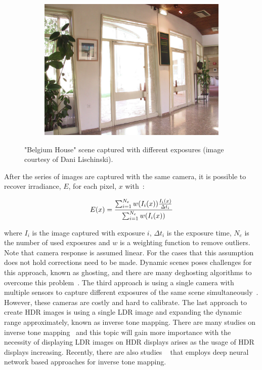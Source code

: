 \begin{figure}
\begin{subfigure}[b]{0.33\textwidth}
    \includegraphics[width=\textwidth]{figures/chapter2/exposure/bh9.jpg}
\end{subfigure}\hfill
\caption{"Belgium House" scene captured with different exposures (image courtesy of Dani Lischinski). }
\label{fig:exposures}
\end{figure}

After the series of images are captured with the same camera, it is possible to recover irradiance, $E$, for each pixel, $x$ with~\cite{banterle2017advanced}:

\begin{equation}
    E(x) = {{\sum^{N_e}_{i=1} w(I_i(x)) {I_i(x) \over \Delta t_i}} \over {\sum^{N_e}_{i=1} w(I_i(x))}} 
\end{equation}

where $I_i$ is the image captured with exposure $i$, $\Delta t_i$ is the exposure time, $N_e$ is the number of used exposures and $w$ is a weighting function to remove outliers. Note that camera response is assumed linear. For the cases that this assumption does not hold corrections need to be made. Dynamic scenes poses challenges for this approach, known as ghosting, and there are many deghosting algorithms to overcome this problem~\cite{Tursun2015_deghosting_survey}. The third approach is using a single camera with multiple sensors to capture different exposures of the same scene simultaneously~\cite{tocci2011versatile,mcguire2007optical}. However, these cameras are costly and hard to calibrate. The last approach to create HDR images is using a single LDR image and expanding the dynamic range approximately, known as inverse tone mapping. There are many studies on inverse tone mapping~\cite{akyuz2007hdr,masia2009evaluation,wang2007high,huo2014physiological} and this topic will gain more importance with the necessity of displaying LDR images on HDR displays arises as the usage of HDR displays increasing. Recently, there are also studies ~\cite{eilertsen2017hdr,metzler2020deep} that employs deep neural network based approaches for inverse tone mapping. 


